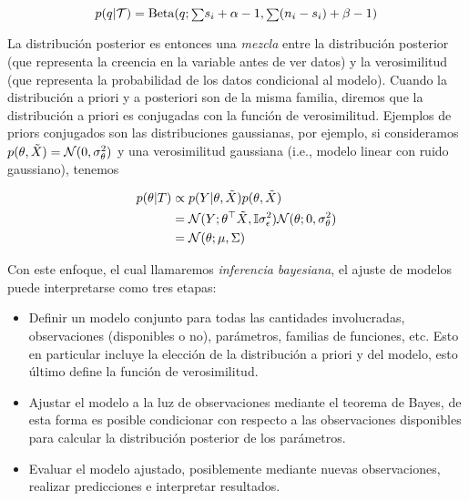 \begin{equation}
	p(q|{\mathcal T}) = \text{Beta}(q;{\scriptstyle\sum} s_i + \alpha - 1,{\scriptstyle\sum} (n_i-s_i) + \beta-1)
\end{equation}






La distribución posterior es entonces una \emph{mezcla} entre la distribución posterior (que representa la creencia en la variable antes de ver datos) y la verosimilitud (que representa la probabilidad de los datos condicional al modelo). Cuando la distribución a priori y a posteriori son de la misma familia, diremos que  la distribución a priori es conjugadas con la función de verosimilitud. Ejemplos de priors conjugados son las distribuciones gaussianas, por ejemplo, si consideramos $p(\theta,\tilde{X}) = {\mathcal N}(0,\sigma_\theta^2)$ y una verosimilitud gaussiana (i.e., modelo linear con ruido gaussiano), tenemos

\begin{align}
	p(\theta|T)	&\propto p(Y|\theta,\tilde{X})p(\theta,\tilde{X})\label{eq:gaussian_post}\\
				&= {\mathcal N}(Y;\theta^\top\tilde{X},{\mathbb I}\sigma_\epsilon^2){\mathcal N}(\theta;0,\sigma_\theta^2)\nonumber\\
				&={\mathcal N}(\theta; \mu,\Sigma)\nonumber
\end{align}





Con este enfoque, el cual llamaremos \emph{inferencia bayesiana}, el ajuste de modelos puede interpretarse como tres etapas:

\begin{itemize}
	\item Definir un modelo conjunto para todas las cantidades involucradas, observaciones (disponibles o no), parámetros, familias de funciones, etc. Esto en particular incluye la elección de la distribución a priori y del modelo, esto último define la función de verosimilitud.
	\item Ajustar el modelo a la luz de observaciones mediante el teorema de Bayes, de esta forma es posible condicionar con respecto a las observaciones disponibles para calcular la distribución posterior de los parámetros.  
	\item Evaluar el modelo ajustado, posiblemente mediante nuevas observaciones, realizar predicciones e  interpretar resultados.
\end{itemize}



